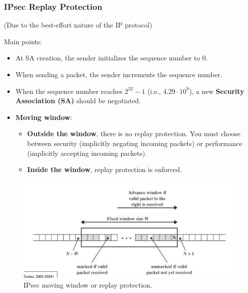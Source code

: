 \subsubsection{IPsec Replay Protection}
\begin{center}
    (Due to the best-effort nature of the IP protocol)
\end{center}
Main points:
\begin{itemize}
    \item At SA creation, the sender initializes the sequence number to 0.
    \item When sending a packet, the sender increments the sequence number.
    \item When the sequence number reaches \( 2^{32} - 1 \) (i.e., \( 4.29 \cdot 10^{9}\)), a new \textbf{Security Association (SA)} should be negotiated.
    \item \textbf{Moving window}:
    \begin{itemize}
        \item \textbf{Outside the window}, there is no replay protection. You must choose between security (implicitly negating incoming packets) or performance (implicitly accepting incoming packets).
        \item \textbf{Inside the window}, replay protection is enforced.
    \end{itemize}
\end{itemize}

\begin{figure}[H]
  \includegraphics[width=\linewidth]{Images/NetSec/ipsec_replay_protection.png}
  \caption{IPsec moving window or replay protection.}
\end{figure}


